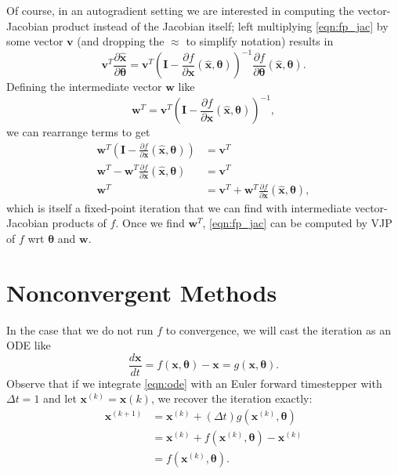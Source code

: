 \documentclass{article}
\newcommand{\mat}[1]{\bm{{#1}}}
\renewcommand{\vec}[1]{\bm{{#1}}}
\theoremstyle{definition}
\begin{document}
Of course, in an autogradient setting we are interested in computing the vector-Jacobian product instead of the Jacobian itself; left multiplying \cref{eqn:fp_jac} by some vector $\vec{v}$ (and dropping the $\approx$ to simplify notation) results in
\begin{equation}
  \vec{v}^T \frac{\partial \hat{\vec{x}}}{\partial \vec{\theta}} = \vec{v}^T \left(\mat{I} - \frac{\partial f}{\partial \vec{x}} \left(\hat{\vec{x}}, \vec{\theta}\right)\right)^{-1} \frac{\partial f}{\partial \vec{\theta}} \left(\hat{\vec{x}}, \vec{\theta}\right).
\end{equation}
Defining the intermediate vector $\vec{w}$ like
\begin{equation}
  \vec{w}^T = \vec{v}^T \left(\mat{I} - \frac{\partial f}{\partial \vec{x}} \left(\hat{\vec{x}}, \vec{\theta}\right)\right)^{-1},
\end{equation}
we can rearrange terms to get
\begin{align}
  \vec{w}^T \left(\mat{I} - \frac{\partial f}{\partial \vec{x}} \left(\hat{\vec{x}}, \vec{\theta}\right)\right) &= \vec{v}^T \\
  \vec{w}^T  - \vec{w}^T\frac{\partial f}{\partial \vec{x}} \left(\hat{\vec{x}}, \vec{\theta}\right) &= \vec{v}^T \\
  \vec{w}^T &= \vec{v}^T + \vec{w}^T\frac{\partial f}{\partial \vec{x}} \left(\hat{\vec{x}}, \vec{\theta}\right), \label{eqn:fp_w}
\end{align}
which is itself a fixed-point iteration that we can find with intermediate vector-Jacobian products of $f$.  Once we find $\vec{w}^T$, \cref{eqn:fp_jac} can be computed by VJP of $f$ wrt $\vec{\theta}$ and $\vec{w}$.
\section{Nonconvergent Methods}
In the case that we do not run $f$ to convergence, we will cast the iteration as an ODE like
\begin{equation}
  \frac{d\vec{x}}{dt} = f\left(\vec{x}, \vec{\theta}\right) - \vec{x} = g\left(\vec{x}, \vec{\theta}\right). \label{eqn:ode}
\end{equation}
Observe that if we integrate \cref{eqn:ode} with an Euler forward timestepper with $\Delta t=1$ and let $\vec{x}^{(k)} = \vec{x}(k)$, we recover the iteration exactly:
\begin{align}
  \vec{x}^{(k+1)} &= \vec{x}^{(k)} + \left(\Delta t\right)g\left(\vec{x}^{(k)}, \vec{\theta}\right) \\
                  &= \vec{x}^{(k)} + f\left(\vec{x}^{(k)}, \vec{\theta}\right) - \vec{x}^{(k)} \\
                  &= f\left(\vec{x}^{(k)}, \vec{\theta}\right).
\end{align}
\end{document}
